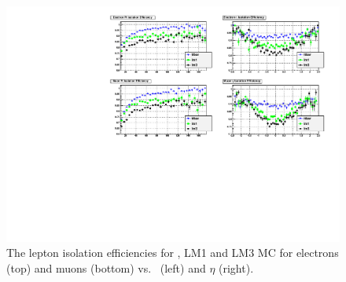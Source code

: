 \begin{figure}[tbh]
\begin{center}
\includegraphics[width=\linewidth]{plots/tt_and_lm_isolationEfficiencies.pdf}
\caption{\label{fig:leptoniso} 
The lepton isolation efficiencies for \ttbar, LM1 and LM3 MC for electrons (top) and muons (bottom)
vs. \pt\ (left) and $\eta$ (right).
}
\end{center}
\end{figure}
